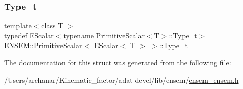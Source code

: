 \subsubsection{\texorpdfstring{Type\_t}{Type\_t}\hspace{0.1cm}{\footnotesize\ttfamily [3/3]}}
{\footnotesize\ttfamily template$<$class T $>$ \\
typedef \mbox{\hyperlink{classENSEM_1_1EScalar}{E\+Scalar}}$<$typename \mbox{\hyperlink{structENSEM_1_1PrimitiveScalar}{Primitive\+Scalar}}$<$T$>$\+::\mbox{\hyperlink{structENSEM_1_1PrimitiveScalar_3_01EScalar_3_01T_01_4_01_4_ae8493f2baf01f4ada1e2aec48076b72d}{Type\+\_\+t}}$>$ \mbox{\hyperlink{structENSEM_1_1PrimitiveScalar}{E\+N\+S\+E\+M\+::\+Primitive\+Scalar}}$<$ \mbox{\hyperlink{classENSEM_1_1EScalar}{E\+Scalar}}$<$ T $>$ $>$\+::\mbox{\hyperlink{structENSEM_1_1PrimitiveScalar_3_01EScalar_3_01T_01_4_01_4_ae8493f2baf01f4ada1e2aec48076b72d}{Type\+\_\+t}}}



The documentation for this struct was generated from the following file\+:\begin{DoxyCompactItemize}
\item 
/\+Users/archanar/\+Kinematic\+\_\+factor/adat-\/devel/lib/ensem/\mbox{\hyperlink{adat-devel_2lib_2ensem_2ensem__ensem_8h}{ensem\+\_\+ensem.\+h}}\end{DoxyCompactItemize}
